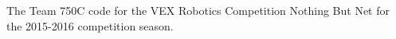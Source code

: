 The Team 750C code for the V\+EX Robotics Competition Nothing But Net for the 2015-\/2016 competition season. 